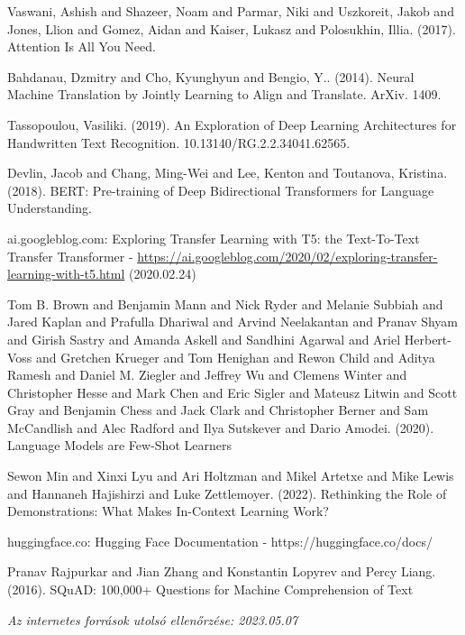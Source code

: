 \documentclass[12pt,a4paper]{report}
\begin{document}
\begin{thebibliography}{100}
 Vaswani, Ashish and Shazeer, Noam and Parmar, Niki and Uszkoreit, Jakob and Jones, Llion and Gomez, Aidan and Kaiser, Lukasz and Polosukhin, Illia. (2017). Attention Is All You Need.

 Bahdanau, Dzmitry and Cho, Kyunghyun and Bengio, Y.. (2014). Neural Machine Translation by Jointly Learning to Align and Translate. ArXiv. 1409.

 Tassopoulou, Vasiliki. (2019). An Exploration of Deep Learning Architectures for Handwritten Text Recognition. 10.13140/RG.2.2.34041.62565.

 Devlin, Jacob and Chang, Ming-Wei and Lee, Kenton and Toutanova, Kristina. (2018). BERT: Pre-training of Deep Bidirectional Transformers for Language Understanding.

 ai.googleblog.com: Exploring Transfer Learning with T5: the Text-To-Text Transfer Transformer -  \url{https://ai.googleblog.com/2020/02/exploring-transfer-learning-with-t5.html} (2020.02.24)

 Tom B. Brown and Benjamin Mann and Nick Ryder and Melanie Subbiah and Jared Kaplan and Prafulla Dhariwal and Arvind Neelakantan and Pranav Shyam and Girish Sastry and Amanda Askell and Sandhini Agarwal and Ariel Herbert-Voss and Gretchen Krueger and Tom Henighan and Rewon Child and Aditya Ramesh and Daniel M. Ziegler and Jeffrey Wu and Clemens Winter and Christopher Hesse and Mark Chen and Eric Sigler and Mateusz Litwin and Scott Gray and Benjamin Chess and Jack Clark and Christopher Berner and Sam McCandlish and Alec Radford and Ilya Sutskever and Dario Amodei. (2020). Language Models are Few-Shot Learners

 Sewon Min and Xinxi Lyu and Ari Holtzman and Mikel Artetxe and Mike Lewis and Hannaneh Hajishirzi and Luke Zettlemoyer. (2022). Rethinking the Role of Demonstrations: What Makes In-Context Learning Work?

 huggingface.co: Hugging Face Documentation - https://huggingface.co/docs/

 Pranav Rajpurkar and Jian Zhang and Konstantin Lopyrev and Percy Liang. (2016). SQuAD: 100,000+ Questions for Machine Comprehension of Text
\end{thebibliography}


\noindent \textit{Az internetes források utolsó ellenőrzése: 2023.05.07}

\pagestyle{empty}

\newpage


\end{document}
